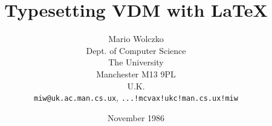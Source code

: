 
\title{Typesetting VDM with \LaTeX}
\author{Mario Wolczko\\
Dept. of Computer Science\\
The University\\
Manchester M13 9PL\\
U.K.\\
\verb;miw@uk.ac.man.cs.ux;, {\tt ...!mcvax!ukc!man.cs.ux!miw}}
\date{November 1986}

\newcommand{\Vdm}{{\tt vdm\/}}

\newenvironment{dangerous}{\endgraf\vspace{5pt}\bgroup\small}%
			  {\endgraf\egroup\vspace{5pt}}

